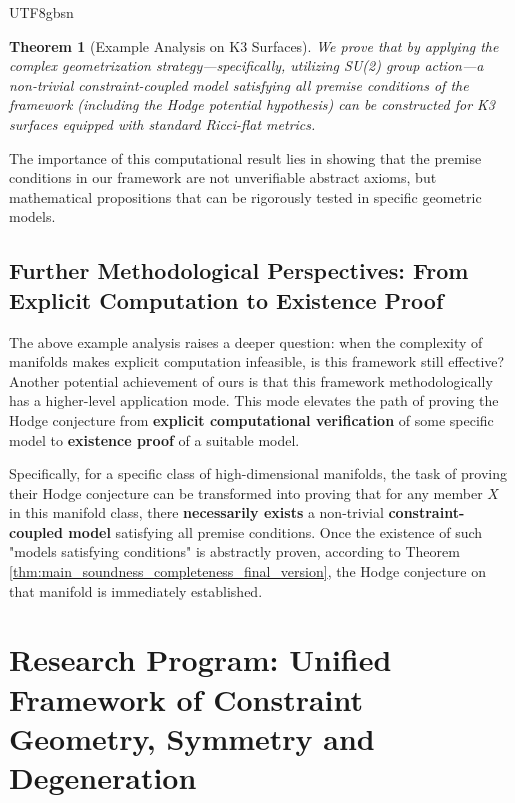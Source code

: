 \documentclass[a4paper,12pt]{extarticle}
\newtheorem{theorem}{Theorem}[section]
\theoremstyle{definition}
\begin{document}
\begin{CJK}{UTF8}{gbsn}
\begin{theorem}[Example Analysis on K3 Surfaces]
\label{thm:main_k3_example_final_version}
We prove that by applying the complex geometrization strategy—specifically, utilizing SU(2) group action—a non-trivial constraint-coupled model satisfying all premise conditions of the framework (including the Hodge potential hypothesis) can be constructed for K3 surfaces equipped with standard Ricci-flat metrics.
\end{theorem}
The importance of this computational result lies in showing that the premise conditions in our framework are not unverifiable abstract axioms, but mathematical propositions that can be rigorously tested in specific geometric models.

\subsection{Further Methodological Perspectives: From Explicit Computation to Existence Proof}

The above example analysis raises a deeper question: when the complexity of manifolds makes explicit computation infeasible, is this framework still effective? Another potential achievement of ours is that this framework methodologically has a higher-level application mode. This mode elevates the path of proving the Hodge conjecture from \textbf{explicit computational verification} of some specific model to \textbf{existence proof} of a suitable model.

Specifically, for a specific class of high-dimensional manifolds, the task of proving their Hodge conjecture can be transformed into proving that for any member $X$ in this manifold class, there \textbf{necessarily exists} a non-trivial \textbf{constraint-coupled model} satisfying all premise conditions. Once the existence of such "models satisfying conditions" is abstractly proven, according to Theorem \ref{thm:main_soundness_completeness_final_version}, the Hodge conjecture on that manifold is immediately established.

\section{Research Program: Unified Framework of Constraint Geometry, Symmetry and Degeneration}
\label{sec:theoretical_framework}


\end{CJK}
\end{document}
